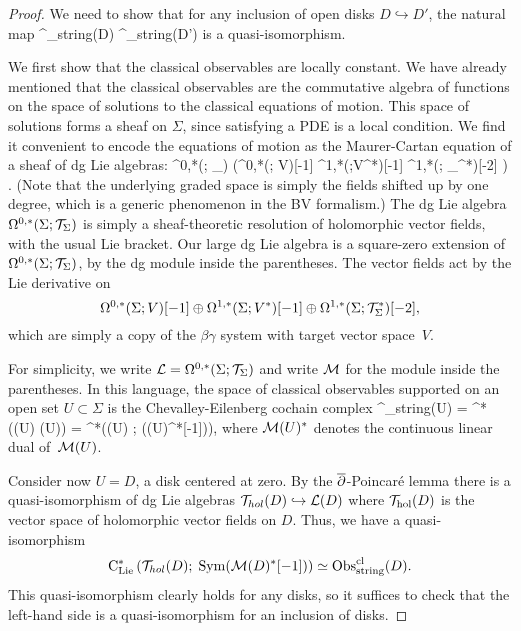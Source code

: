 \begin{proof} 
We need to show that for any inclusion of open disks $D \hookrightarrow D'$, the natural map
\ben
\Obs^\q_{\rm string}(D) \to \Obs^\q_{\rm string}(D')
\een
is a quasi-isomorphism. 

We first show that the classical observables are locally constant. 
We have already mentioned that the classical observables are the commutative algebra of functions on the space of solutions to the classical equations of motion. 
This space of solutions forms a sheaf on $\Sigma$, 
since satisfying a PDE is a local condition.
We find it convenient to encode the equations of motion as the Maurer-Cartan equation of a sheaf  of dg Lie algebras:
\ben
\Omega^{0,*}(\Sigma ; \cT_\Sigma) \ltimes \left(\Omega^{0,*}(\Sigma; V)[-1] \oplus \Omega^{1,*}(\Sigma;V^*)[-1] \oplus \Omega^{1,*}(\Sigma ; \cT_\Sigma^*)[-2] \right) . 
\een
(Note that the underlying graded space is simply the fields shifted up by one degree,
which is a generic phenomenon in the BV formalism.)
The dg Lie algebra $\Omega^{0,*}(\Sigma ; \mathcal T_\Sigma)$ is simply a sheaf-theoretic resolution of holomorphic vector fields, with the usual Lie bracket.
Our large dg Lie algebra is a square-zero extension of $\Omega^{0,*}(\Sigma ; \mathcal T_\Sigma)$, 
by the dg module inside the parentheses.
The vector fields act by the Lie derivative on 
\[
\Omega^{0,*}(\Sigma; V)[-1] \oplus \Omega^{1,*}(\Sigma;V^*)[-1] \oplus \Omega^{1,*}(\Sigma ; \mathcal T_\Sigma^*)[-2],
\]
which are simply a copy of the $\beta\gamma$ system with target vector space~$V$.
 
For simplicity, we write $\mathcal L = \Omega^{0,*}(\Sigma ; \mathcal T_\Sigma)$ and write $\mathcal M$ for the module inside the parentheses.
In this language, the space of classical observables supported on an open set $U \subset \Sigma$ is the Chevalley-Eilenberg cochain complex
\ben
\Obs^{\cl}_{\rm string}(U) = \clie^*\left(\cL(U) \ltimes \cM(U)\right) = \clie^*\left(\cL(U) ; \; \Sym(\cM(U)^*[-1])\right),
\een
where $\mathcal M(U)^*$ denotes the continuous linear dual of~$\mathcal M(U)$. 

Consider now $U = D$, a disk centered at zero. 
By the $\overline{\partial}$-Poincar\'{e} lemma 
there is a quasi-isomorphism of dg Lie algebras $\mathcal T_{hol}(D) \hookrightarrow \mathcal L(D)$ where $\mathcal T_{\rm hol}(D)$ is the vector space of holomorphic vector fields on $D$. 
Thus, we have a quasi-isomorphism
\[
{\rm C}_{{\rm Lie}}^*\left(\mathcal T_{hol}(D) ; \; {\rm Sym}(\mathcal M(D)^*[-1])\right) \simeq {\rm Obs}^{{\rm cl}}_{\rm string}(D).
\]
This quasi-isomorphism clearly holds for any disks, so it suffices to check that the left-hand side is a quasi-isomorphism for an inclusion of disks.


\end{proof}
